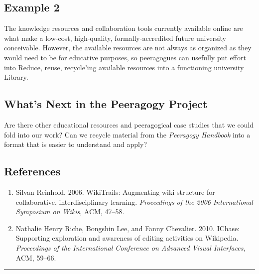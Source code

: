 \hypertarget{example-2}{%
\subsection{Example 2}\label{example-2}}

The knowledge resources and collaboration tools currently available
online are what make a low-cost, high-quality, formally-accredited
future university conceivable. However, the available resources are not
always as organized as they would need to be for educative purposes, so
peeragogues can usefully put effort into {{Reduce, reuse, recycle}}'ing
available resources into a functioning university Library.

\hypertarget{whats-next-in-the-peeragogy-project}{%
\subsection{What's Next in the Peeragogy
Project}\label{whats-next-in-the-peeragogy-project}}

Are there other educational resources and peeragogical case studies that
we could fold into our work? Can we recycle material from the
\emph{Peeragogy Handbook} into a format that is easier to understand and
apply?

\hypertarget{references}{%
\subsection{References}\label{references}}

\begin{enumerate}
\def\labelenumi{\arabic{enumi}.}
\item
  Silvan Reinhold. 2006. WikiTrails: Augmenting wiki structure for
  collaborative, interdisciplinary learning. \emph{Proceedings of the
  2006 International Symposium on Wikis}, ACM, 47--58.
\item
  Nathalie Henry Riche, Bongshin Lee, and Fanny Chevalier. 2010. IChase:
  Supporting exploration and awareness of editing activities on
  Wikipedia. \emph{Proceedings of the International Conference on
  Advanced Visual Interfaces}, ACM, 59--66.
\end{enumerate}

\begin{center}\rule{0.5\linewidth}{0.5pt}\end{center}
